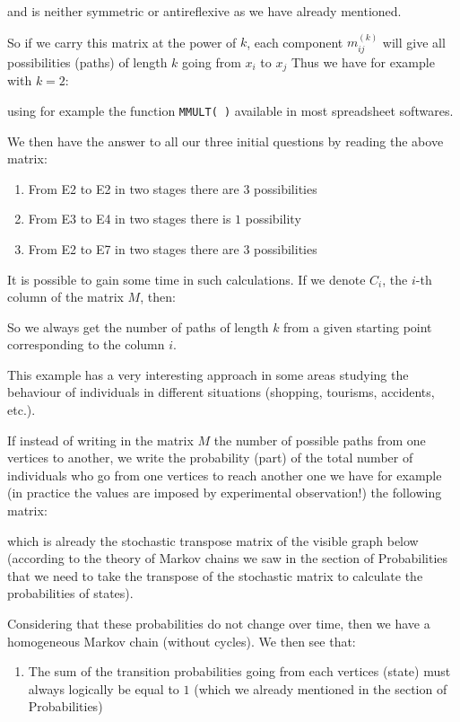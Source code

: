 {	and is neither symmetric or antireflexive as we have already mentioned.
	
	So if we carry this matrix at the power of $k$, each component $m_{ij}^{(k)}$ will give all possibilities (paths) of length $k$ going from $x_i$ to $x_j$ Thus we have for example with $k=2$:
	
	using for example the function \texttt{MMULT( )} available in most spreadsheet softwares.
	
	We then have the answer to all our three initial questions by reading the above matrix:
	\begin{enumerate}
		\item From E2 to E2 in two stages there are $3$ possibilities

		\item  From E3 to E4 in two stages there is $1$ possibility

		\item From E2 to E7 in two stages there are $3$ possibilities
	\end{enumerate}
	It is possible to gain some time in such calculations. If we denote $C_i$, the $i$-th column of the matrix $M$, then:
	
	So we always get the number of paths of length $k$ from a given starting point corresponding to the column $i$.
	
	This example has a very interesting approach in some areas studying the behaviour of individuals in different situations (shopping, tourisms, accidents, etc.).
	
	If instead of writing in the matrix $M$ the number of possible paths from one vertices to another, we write the probability (part) of the total number of individuals who go from one vertices to reach another one we have for example (in practice the values are imposed by experimental observation!) the following matrix:
	
	which is already the stochastic transpose  matrix of the visible graph below (according to the theory of Markov chains we saw in the section of Probabilities that we need to take the transpose of the stochastic matrix to calculate the probabilities of states).
	
	Considering that these probabilities do not change over time, then we have a homogeneous Markov chain (without cycles). We then see that:
	\begin{enumerate}
		\item The sum of the transition probabilities going from each vertices (state) must always logically be equal to $1$ (which we already mentioned in the section of Probabilities)


\end{enumerate}}

